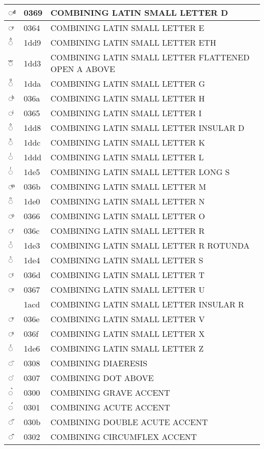 \documentclass[12pt,letterpaper,openany]{book}
\begin{document}
\begin{center}
\begin{supertabular}{|m{0.25in}|m{0.5in}|m{4in}|}
◌ͩ & 0369 & COMBINING LATIN SMALL LETTER D\\\hline
◌ͤ & 0364 & COMBINING LATIN SMALL LETTER E\\\hline
◌ᷙ & 1dd9 & COMBINING LATIN SMALL LETTER ETH\\\hline
◌ᷓ & 1dd3 & \scriptsize COMBINING LATIN SMALL LETTER FLATTENED OPEN A ABOVE\\\hline
◌ᷚ & 1dda & COMBINING LATIN SMALL LETTER G\\\hline
◌ͪ & 036a & COMBINING LATIN SMALL LETTER H\\\hline
◌ͥ & 0365 & COMBINING LATIN SMALL LETTER I\\\hline
◌ᷘ & 1dd8 & COMBINING LATIN SMALL LETTER INSULAR D\\\hline
◌ᷜ & 1ddc & COMBINING LATIN SMALL LETTER K\\\hline
◌ᷝ & 1ddd & COMBINING LATIN SMALL LETTER L\\\hline
◌ᷥ & 1de5 & COMBINING LATIN SMALL LETTER LONG S\\\hline
◌ͫ & 036b & COMBINING LATIN SMALL LETTER M\\\hline
◌ᷠ & 1de0 & COMBINING LATIN SMALL LETTER N\\\hline
◌ͦ & 0366 & COMBINING LATIN SMALL LETTER O\\\hline
◌ͬ & 036c & COMBINING LATIN SMALL LETTER R\\\hline
◌ᷣ & 1de3 & COMBINING LATIN SMALL LETTER R ROTUNDA\\\hline
◌ᷤ & 1de4 & COMBINING LATIN SMALL LETTER S\\\hline
◌ͭ & 036d & COMBINING LATIN SMALL LETTER T\\\hline
◌ͧ & 0367 & COMBINING LATIN SMALL LETTER U\\\hline
◌ᫍ & 1acd & COMBINING LATIN SMALL LETTER INSULAR R\\\hline
◌ͮ & 036e & COMBINING LATIN SMALL LETTER V\\\hline
◌ͯ & 036f & COMBINING LATIN SMALL LETTER X\\\hline
◌ᷦ & 1de6 & COMBINING LATIN SMALL LETTER Z\\\hline
◌̈ & 0308 & COMBINING DIAERESIS\\\hline
◌̇ & 0307 & COMBINING DOT ABOVE\\\hline
◌̀ & 0300 & COMBINING GRAVE ACCENT\\\hline
◌́ & 0301 & COMBINING ACUTE ACCENT\\\hline
◌̋ & 030b & COMBINING DOUBLE ACUTE ACCENT\\\hline
◌̂ & 0302 & COMBINING CIRCUMFLEX ACCENT\\\hline

\end{supertabular}
\end{center}
\end{document}

